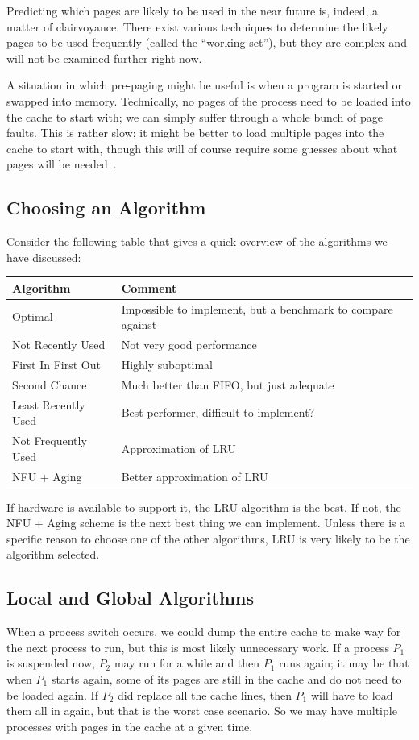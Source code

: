 Predicting which pages are likely to be used in the near future is, indeed, a matter of clairvoyance. There exist various techniques to determine the likely pages to be used frequently (called the ``working set''), but they are complex and will not be examined further right now.

A situation in which pre-paging might be useful is when a program is started or swapped into memory. Technically, no pages of the process need to be loaded into the cache to start with; we can simply suffer through a whole bunch of page faults. This is rather slow; it might be better to load multiple pages into the cache to start with, though this will of course require some guesses about what pages will be needed~\cite{mos}.

\subsection*{Choosing an Algorithm}
Consider the following table that gives a quick overview of the algorithms we have discussed:

\begin{center}
\begin{tabular}{l|l}
	\textbf{Algorithm} & \textbf{Comment} \\ \hline
	Optimal & Impossible to implement, but a benchmark to compare against\\
	Not Recently Used &  Not very good performance \\
	First In First Out & Highly suboptimal \\
	Second Chance & Much better than FIFO, but just adequate \\
	Least Recently Used & Best performer, difficult to implement? \\
	Not Frequently Used & Approximation of LRU \\
	NFU + Aging & Better approximation of LRU\\
\end{tabular}
\end{center}

If hardware is available to support it, the LRU algorithm is the best. If not, the NFU + Aging scheme is the next best thing we can implement. Unless there is a specific reason to choose one of the other algorithms, LRU is very likely to be the algorithm selected.

\subsection*{Local and Global Algorithms}
When a process switch occurs, we could dump the entire cache to make way for the next process to run, but this is most likely unnecessary work. If a process $P_{1}$ is suspended now, $P_{2}$ may run for a while and then $P_{1}$ runs again; it may be that when $P_{1}$ starts again, some of its pages are still in the cache and do not need to be loaded again. If $P_{2}$ did replace all the cache lines, then $P_{1}$ will have to load them all in again, but that is the worst case scenario. So we may have multiple processes with pages in the cache at a given time.

